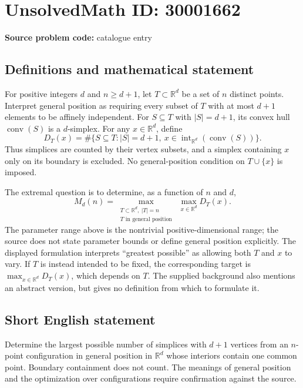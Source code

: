 \documentclass[11pt]{article}
\newcommand{\R}{\mathbb{R}}
\begin{document}
\section*{UnsolvedMath ID: 30001662}
\textbf{Source problem code:} catalogue entry
\subsection{Definitions and mathematical statement}
For positive integers \(d\) and \(n\ge d+1\), let \(T\subset\R^d\) be a set of \(n\) distinct points. Interpret general position as requiring every subset of \(T\) with at most \(d+1\) elements to be affinely independent. For \(S\subseteq T\) with \(|S|=d+1\), its convex hull \(\operatorname{conv}(S)\) is a \(d\)-simplex. For any \(x\in\R^d\), define
\[
D_T(x)=\#\bigl\{S\subseteq T:|S|=d+1,\ x\in\operatorname{int}_{\R^d}(\operatorname{conv}(S))\bigr\}.
\]
Thus simplices are counted by their vertex subsets, and a simplex containing \(x\) only on its boundary is excluded. No general-position condition on \(T\cup\{x\}\) is imposed.

The extremal question is to determine, as a function of \(n\) and \(d\),
\[
M_d(n)=\max_{\substack{T\subset\R^d,\ |T|=n\\ T\text{ in general position}}}\ \max_{x\in\R^d}D_T(x).
\]
The parameter range above is the nontrivial positive-dimensional range; the source does not state parameter bounds or define general position explicitly. The displayed formulation interprets ``greatest possible'' as allowing both \(T\) and \(x\) to vary. If \(T\) is instead intended to be fixed, the corresponding target is \(\max_{x\in\R^d}D_T(x)\), which depends on \(T\). The supplied background also mentions an abstract version, but gives no definition from which to formulate it.
\subsection{Short English statement}
Determine the largest possible number of simplices with \(d+1\) vertices from an \(n\)-point configuration in general position in \(\R^d\) whose interiors contain one common point. Boundary containment does not count. The meanings of general position and the optimization over configurations require confirmation against the source.
\end{document}
